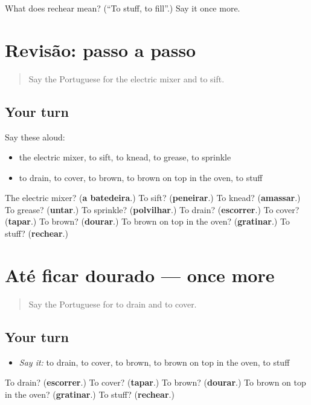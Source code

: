 \begin{tcolorbox}[breakable,colback=teal!4,colframe=teal!35!black,title={Before you move on}]
What does rechear mean? (\textquotedblleft{}To stuff, to fill\textquotedblright{}.) Say it once more.
\end{tcolorbox}
\section[(dialogue)]{Revisão: passo a passo}

\label{lesson:PT-R334-revisao-333-334}



\begin{quote}
Say the Portuguese for the electric mixer and to sift.
\end{quote}

\subsection*{Your turn}
Say these aloud:

\begin{itemize}
\raggedright
  \item the electric mixer, to sift, to knead, to grease, to sprinkle
  \item to drain, to cover, to brown, to brown on top in the oven, to stuff
\end{itemize}

\begin{tcolorbox}[breakable,colback=teal!4,colframe=teal!35!black,title={Before you move on}]
The electric mixer? (\textbf{a batedeira}.) To sift? (\textbf{peneirar}.) To knead? (\textbf{amassar}.) To grease? (\textbf{untar}.) To sprinkle? (\textbf{polvilhar}.) To drain? (\textbf{escorrer}.) To cover? (\textbf{tapar}.) To brown? (\textbf{dourar}.) To brown on top in the oven? (\textbf{gratinar}.) To stuff? (\textbf{rechear}.)
\end{tcolorbox}
\section[(dialogue)]{Até ficar dourado — once more}

\label{lesson:PT-R334-revisao-final-334}



\begin{quote}
Say the Portuguese for to drain and to cover.
\end{quote}

\subsection*{Your turn}
\begin{itemize}
\raggedright
  \item \emph{Say it:} to drain, to cover, to brown, to brown on top in the oven, to stuff
\end{itemize}

\begin{tcolorbox}[breakable,colback=teal!4,colframe=teal!35!black,title={Before you move on}]
To drain? (\textbf{escorrer}.) To cover? (\textbf{tapar}.) To brown? (\textbf{dourar}.) To brown on top in the oven? (\textbf{gratinar}.) To stuff? (\textbf{rechear}.)
\end{tcolorbox}
